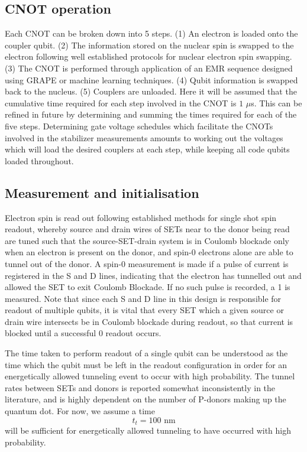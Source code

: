 \documentclass[../Thesis.tex]{subfiles}
\begin{document}
\subsection{CNOT operation}
Each CNOT can be broken down into 5 steps\cite{hill_exchange-based_2021}. (1) An electron is loaded onto the coupler qubit. (2) The information stored on the nuclear spin is swapped to the electron following well established protocols for nuclear electron spin swapping\cite{morton_solid-state_2008}. (3) The CNOT is performed through application of an EMR sequence designed using GRAPE or machine learning techniques. (4) Qubit information is swapped back to the nucleus. (5) Couplers are unloaded. Here it will be assumed that the cumulative time required for each step involved in the CNOT is $1$ $\mu$s. This can be refined in future by determining and summing the times required for each of the five steps. Determining gate voltage schedules which facilitate the CNOTs involved in the stabilizer measurements amounts to working out the voltages which will load the desired couplers at each step, while keeping all code qubits loaded throughout.

\subsection{Measurement and initialisation}
 Electron spin is read out following established methods for single shot spin readout\cite{morello_single-shot_2010}, whereby source and drain wires of SETs near to the donor being read are tuned such that the source-SET-drain system is in Coulomb blockade only when an electron is present on the donor, and spin-0 electrons alone are able to tunnel out of the donor. A spin-0 measurement is made if a pulse of current is registered in the S and D lines, indicating that the electron has tunnelled out and allowed the SET to exit Coulomb Blockade. If no such pulse is recorded, a 1 is measured. Note that since each S and D line in this design is responsible for readout of multiple qubits, it is vital that every SET which a given source or drain wire intersects be in Coulomb blockade during readout, so that current is blocked until a successful 0 readout occurs.
 
The time taken to perform readout of a single qubit can be understood as the time which the qubit must be left in the readout configuration in order for an energetically allowed tunneling event to occur with high probability. The tunnel rates between SETs and donors is reported somewhat inconsistently in the literature, and is highly dependent on the number of P-donors making up the quantum dot. For now, we assume a time 
\begin{equation}
    t_t = 100\text{ nm}
\end{equation} 
will be sufficient for energetically allowed tunneling to have occurred with high probability. 
 
\end{document}
